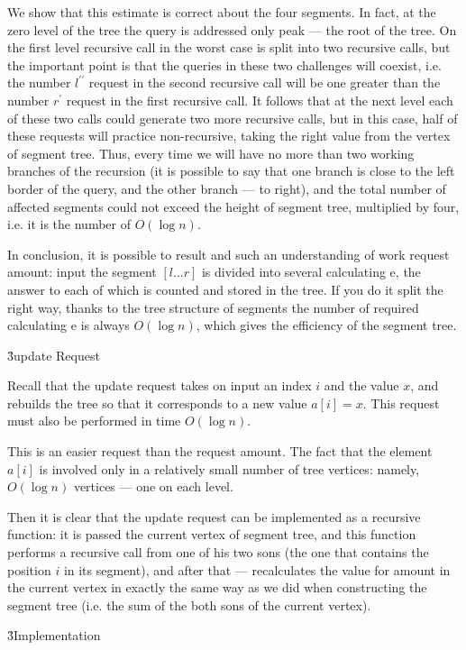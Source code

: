We show that this estimate is correct about the four segments. In fact, at the zero level of the tree the query is addressed only peak --- the root of the tree. On the first level recursive call in the worst case is split into two recursive calls, but the important point is that the queries in these two challenges will coexist, i.e. the number $l^{\prime\prime}$ request in the second recursive call will be one greater than the number $r^\prime$ request in the first recursive call. It follows that at the next level each of these two calls could generate two more recursive calls, but in this case, half of these requests will practice non-recursive, taking the right value from the vertex of segment tree. Thus, every time we will have no more than two working branches of the recursion (it is possible to say that one branch is close to the left border of the query, and the other branch --- to right), and the total number of affected segments could not exceed the height of segment tree, multiplied by four, i.e. it is the number of $O (\log n)$.

In conclusion, it is possible to result and such an understanding of work request amount: input the segment $[l \ldots r]$ is divided into several calculating e, the answer to each of which is counted and stored in the tree. If you do it split the right way, thanks to the tree structure of segments the number of required calculating e is always $O (\log n)$, which gives the efficiency of the segment tree.


\h3{update Request}

Recall that the update request takes on input an index $i$ and the value $x$, and rebuilds the tree so that it corresponds to a new value $a[i]=x$. This request must also be performed in time $O (\log n)$.

This is an easier request than the request amount. The fact that the element $a[i]$ is involved only in a relatively small number of tree vertices: namely, $O (\log n)$ vertices --- one on each level.

Then it is clear that the update request can be implemented as a recursive function: it is passed the current vertex of segment tree, and this function performs a recursive call from one of his two sons (the one that contains the position $i$ in its segment), and after that --- recalculates the value for amount in the current vertex in exactly the same way as we did when constructing the segment tree (i.e. the sum of the both sons of the current vertex).


\h3{Implementation}


